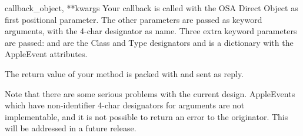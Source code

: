 \begin{funcdesc}{callback}{_object, **kwargs}
Your callback is called with the OSA Direct Object as first positional
parameter. The other parameters are passed as keyword arguments, with
the 4-char designator as name. Three extra keyword parameters are
passed:  and  are the Class and Type
designators and  is a dictionary with the AppleEvent
attributes.

The return value of your method is packed with
 and sent as reply.
\end{funcdesc}

Note that there are some serious problems with the current
design. AppleEvents which have non-identifier 4-char designators for
arguments are not implementable, and it is not possible to return an
error to the originator. This will be addressed in a future release.
